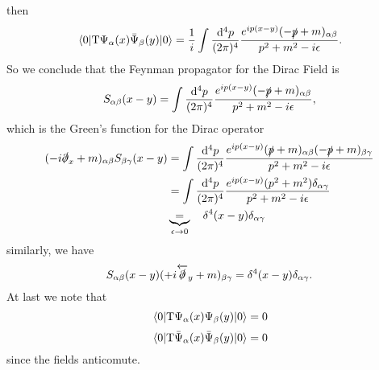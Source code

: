 then
\begin{equation}
    \vev{\text{T}\Psi_\alpha(x)\bar{\Psi}_\beta(y)}=\frac{1}{i}\int\frac{\dd^4 p}{(2\pi)^4}\frac{e^{ip(x-y)}(-\slashed{p}+m)_{\alpha\beta}}{p^2+m^2-i\epsilon}.
\end{equation}
So we conclude that the Feynman propagator for the Dirac Field is
\begin{equation}
    S_{\alpha\beta}(x-y)=\int\frac{\dd^4 p}{(2\pi)^4}\frac{e^{ip(x-y)}(-\slashed{p}+m)_{\alpha\beta}}{p^2+m^2-i\epsilon},
    \label{dirac_free_prop}
\end{equation}
which is the Green's function for the Dirac operator
\begin{equation}
\begin{aligned}
    (-i\slashed{\partial}_x+m)_{\alpha\beta}S_{\beta\gamma}(x-y)&=\int\frac{\dd^4 p}{(2\pi)^4}\frac{e^{ip(x-y)}(\slashed{p}+m)_{\alpha\beta}(-\slashed{p}+m)_{\beta\gamma}}{p^2+m^2-i\epsilon}\\
    &=\int\frac{\dd^4 p}{(2\pi)^4}\frac{e^{ip(x-y)}(p^2+m^2)\delta_{\alpha\gamma}}{p^2+m^2-i\epsilon}\\
    &\underbrace{=}_{\epsilon\to0}\quad\delta^4(x-y)\delta_{\alpha\gamma}
\end{aligned}
\end{equation}
similarly, we have
\begin{equation}
    S_{\alpha\beta}(x-y)(+i\overleftarrow{\slashed{\partial}}_y+m)_{\beta\gamma}=\delta^4(x-y)\delta_{\alpha\gamma}.
\end{equation}
At last we note that
\begin{equation}
    \vev{\text{T}\Psi_\alpha(x)\Psi_\beta(y)}=0
\end{equation}
\begin{equation}
    \vev{\text{T}\bar{\Psi}_\alpha(x)\bar{\Psi}_\beta(y)}=0
\end{equation}
since the fields anticomute. 
